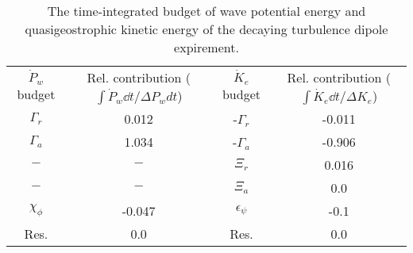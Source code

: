 \begin{table}
\begin{center}
\caption{The time-integrated budget of wave potential energy and quasigeostrophic                kinetic energy of the decaying turbulence dipole expirement. \label{table2}}
\begin{tabular}{cccc}
$\dot{P}_w$ budget & Rel. contribution ($\int\dot{P}_w \dd t/\Delta P_w dt$) & $\dot{K}_e$ budget & Rel. contribution ($\int\dot{K}_e \dd t/\Delta K_e$) \\
$\Gamma_r$ & 0.012 & -$\Gamma_r$ & -0.011 \\
$\Gamma_a$ & 1.034 & -$\Gamma_a$ & -0.906 \\
$-$ & $-$ & $\Xi_r$ & 0.016 \\
$-$ & $-$ & $\Xi_a$ & 0.0 \\
$\chi_\phi$ & -0.047 & $\epsilon_\psi$ & -0.1 \\
Res. & 0.0 & Res. & 0.0 \\
\end{tabular}
\end{center}
\end{table}
